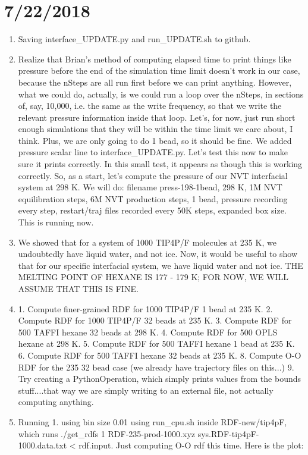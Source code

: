 \documentclass[12pt,reqno]{amsart}
\numberwithin{equation}{section}
\begin{document}
\section{7/22/2018}
\begin{enumerate}
\item Saving interface\_UPDATE.py and run\_UPDATE.sh to github.  
\item Realize that Brian's method of computing elapsed time to print things like pressure before the end of the simulation time limit doesn't work in our case, because the nSteps are all run first before we can print anything.  However, what we could do, actually, is we could run a loop over the nSteps, in sections of, say, 10,000, i.e. the same as the write frequency, so that we write the relevant pressure information inside that loop.  Let's, for now, just run short enough simulations that they will be within the time limit we care about, I think.  Plus, we are only going to do 1 bead, so it should be fine.  We added pressure scalar line to interface\_UPDATE.py.  Let's test this now to make sure it prints correctly.  In this small test, it appears as though this is working correctly.  So, as a start, let's compute the pressure of our NVT interfacial system at 298 K.  We will do: filename press-198-1bead, 298 K, 1M NVT equilibration steps, 6M NVT production steps, 1 bead, pressure recording every step, restart/traj files recorded every 50K steps, expanded box size.  This is running now.  
\item We showed that for a system of 1000 TIP4P/F molecules at 235 K, we undoubtedly have liquid water, and not ice.  Now, it would be useful to show that for our specific interfacial system, we have liquid water and not ice.  THE MELTING POINT OF HEXANE IS 177 - 179 K; FOR NOW, WE WILL ASSUME THAT THIS IS FINE.  
\item 1.  Compute finer-grained RDF for 1000 TIP4P/F 1 bead at 235 K.  2.  Compute RDF for 1000 TIP4P/F 32 beads at 235 K.  3.  Compute RDF for 500 TAFFI hexane 32 beads at 298 K.  4.  Compute RDF for 500 OPLS hexane at 298 K.  5.  Compute RDF for 500 TAFFI hexane 1 bead at 235 K.  6.  Compute RDF for 500 TAFFI hexane 32 beads at 235 K. 8. Compute O-O RDF for the 235 32 bead case (we already have trajectory files on this...)   9.  Try creating a PythonOperation, which simply prints values from the bounds stuff....that way we are simply writing to an external file, not actually computing anything.  
\item Running 1. using bin size 0.01 using run\_cpu.sh inside RDF-new/tip4pF, which runs ./get\_rdfs 1 RDF-235-prod-1000.xyz sys.RDF-tip4pF-1000.data.txt < rdf.input.  Just computing O-O rdf this time.  Here is the plot:

\end{enumerate}
\end{document}
